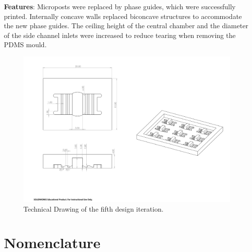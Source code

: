 \documentclass[letterpaper,12pt]{article}
\begin{document}
\textbf{Features}: Microposts were replaced by phase guides, which were successfully printed. Internally concave walls replaced biconcave structures to accommodate the new phase guides. The ceiling height of the central chamber and the diameter of the side channel inlets were increased to reduce tearing when removing the PDMS mould.

\begin{figure}[!h]
    \centering
    \includegraphics[width=1\linewidth]{PDF/TDV5.pdf}
    \caption{Technical Drawing of the fifth design iteration.}
    \label{fig:TDV5}
\end{figure}

\clearpage





\section{Nomenclature}
\end{document}
